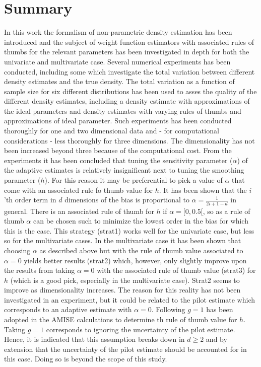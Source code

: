 \documentclass[
twoside,
openright,
titlepage,
numbers=noenddot,
headinclude,%
footinclude=true,
dottedtoc, %
ngerman,
american, %
pagesize=pdftex,
]{book}
\begin{document}
	\section{Summary}
	In this work the formalism of non-parametric density estimation has been introduced and the subject of weight function estimators with associated rules of thumbs for the relevant parameters has been investigated in depth for both the univariate and multivariate case. Several numerical experiments has been conducted, including some which investigate the total variation between different density estimates and the true density. The total variation as a function of sample size for six different distributions has been used to asses the quality of the different density estimates, including a density estimate with approximations of the ideal parameters and density estimates with varying rules of thumbs and approximations of ideal parameter. Such experiments has been conducted thoroughly for one and two dimensional data and - for computational considerations - less thoroughly for three dimensions. The dimensionality has not been increased beyond three because of the computational cost. From the experiments it has been concluded that tuning the sensitivity parameter ($\alpha$) of the adaptive estimates is relatively insignificant next to tuning the smoothing parameter ($h$). For this reason it may be preferential to pick a value of $\alpha$ that come with an associated rule fo thumb value for $h$. It has been shown that the $i$'th order term in $d$ dimensions of the bias is proportional to $\alpha=\frac{1}{2i+1-d}$ in general. There is an associated rule of thumb for $h$ if $\alpha=[0,0.5[$, so as a rule of thumb $\alpha$ can be chosen such to minimize the lowest order in the bias for which this is the case. This strategy (strat1) works well for the univariate case, but less so for the multivariate cases. In the multivariate case it has been shown that choosing $\alpha$ as described above but with the rule of thumb value associated to $\alpha=0$ yields better results (strat2) which, however, only slightly improve upon the results from taking $\alpha=0$ with the associated rule of thumb value (strat3) for $h$ (which is a good pick, especially in the multivariate case). Strat2 seems to improve as dimensionality increases. The reason for this reality has not been investigated in an experiment, but it could be related to the pilot estimate which corresponds to an adaptive estimate with $\alpha=0$. Following \citet{Silverman86} $g=1$ has been adopted in the AMISE calculations to determine th rule of thumb value for $h$. Taking $g=1$ corresponds to ignoring the uncertainty of the pilot estimate. Hence, it is indicated that this assumption breaks down in $d\geq 2$ and by extension that the uncertainty of the pilot estimate should be accounted for in this case. Doing so is beyond the scope of this study.\newline
\end{document}
